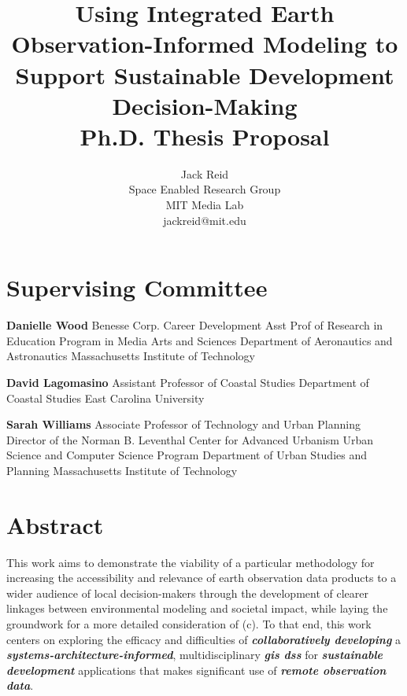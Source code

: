 \documentclass[notitlepage]{article}
\newcommand{\compr}{Danielle Wood}
\newcommand{\comte}{David Lagomasino}
\newcommand{\comco}{Sarah Williams}
\newcommand{\comprcredentials}{\newline\indent Benesse Corp. Career Development Asst Prof of Research in Education \newline\indent Program in Media Arts and Sciences  \newline\indent Department of Aeronautics and Astronautics \newline\indent Massachusetts Institute of Technology}
\newcommand{\comtecredentials}{\newline\indent Assistant Professor of Coastal Studies \newline\indent Department of Coastal Studies \newline\indent East Carolina University}
\newcommand{\comcocredentials}{\newline\indent Associate Professor of Technology and Urban Planning \newline\indent  Director of the Norman B. Leventhal Center for Advanced Urbanism \newline\indent Urban Science and Computer Science Program \newline\indent Department of Urban Studies and Planning \newline\indent Massachusetts Institute of Technology}
\begin{document}
\pretitle{\begin{center}\Huge\bfseries}
\posttitle{\par\end{center}\vskip 0.5em}
\preauthor{\begin{center}\Large\ttfamily}
\postauthor{\end{center}}
\predate{\par\large\centering}
\postdate{\par}

\title{Using Integrated Earth Observation-Informed Modeling to Support Sustainable Development Decision-Making \\  
\large Ph.D. Thesis Proposal} 
\author{%
Jack Reid\\ 
Space Enabled Research Group\\
MIT Media Lab\\
jackreid@mit.edu}

\maketitle

\section*{Supervising Committee}


\vspace{\baselineskip}

\textbf{\compr} \comprcredentials 
 
\vspace{\baselineskip}

\textbf{\comte} \comtecredentials

\vspace{\baselineskip}

\textbf{\comco} \comcocredentials

\thispagestyle{plain}
\pagestyle{plain}

\clearpage

\section*{Abstract}


This work aims to demonstrate the viability of a particular methodology for increasing the accessibility and relevance of earth observation data products to a wider audience of local decision-makers through the development of clearer linkages between environmental modeling and societal impact, while laying the groundwork for a more detailed consideration of (c). To that end, this work centers on exploring the efficacy and difficulties of \textbf{\textit{collaboratively developing}} a \textbf{\textit{systems-architecture-informed}}, multidisciplinary \textbf{\textit{\ac{gis} \ac{dss}}} for \textbf{\textit{sustainable development}} applications that makes significant use of \textbf{\textit{remote observation data}}. 
\end{document}
